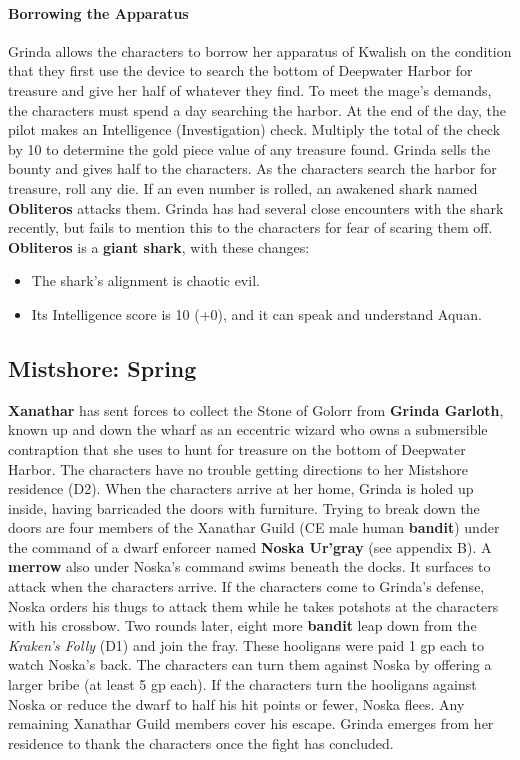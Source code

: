 \documentclass[10pt,a4paper,twoside,twocolumn,openany,nodeprecatedcode]{dndbook}
\begin{document}
\paragraph{Borrowing the Apparatus}
Grinda allows the characters to borrow her apparatus of Kwalish on the condition that they first use the device to search the bottom of Deepwater Harbor for treasure and give her half of whatever they find. To meet the mage's demands, the characters must spend a day searching the harbor. At the end of the day, the pilot makes an Intelligence (Investigation) check. Multiply the total of the check by 10 to determine the gold piece value of any treasure found. Grinda sells the bounty and gives half to the characters.
As the characters search the harbor for treasure, roll any die. If an even number is rolled, an awakened shark named \textbf{Obliteros} attacks them. Grinda has had several close encounters with the shark recently, but fails to mention this to the characters for fear of scaring them off. \textbf{Obliteros} is a \textbf{giant shark}, with these changes:
\begin{itemize}

\item The shark's alignment is chaotic evil.
\item Its Intelligence score is 10 (+0), and it can speak and understand Aquan.
\end{itemize}


\subsection{Mistshore: Spring}
\textbf{Xanathar} has sent forces to collect the Stone of Golorr from \textbf{Grinda Garloth}, known up and down the wharf as an eccentric wizard who owns a submersible contraption that she uses to hunt for treasure on the bottom of Deepwater Harbor. The characters have no trouble getting directions to her Mistshore residence (D2).
When the characters arrive at her home, Grinda is holed up inside, having barricaded the doors with furniture. Trying to break down the doors are four members of the Xanathar Guild (CE male human \textbf{bandit}) under the command of a dwarf enforcer named \textbf{Noska Ur'gray} (see appendix B). A \textbf{merrow} also under Noska's command swims beneath the docks. It surfaces to attack when the characters arrive.
If the characters come to Grinda's defense, Noska orders his thugs to attack them while he takes potshots at the characters with his crossbow. Two rounds later, eight more \textbf{bandit} leap down from the \textit{Kraken's Folly} (D1) and join the fray. These hooligans were paid 1 gp each to watch Noska's back. The characters can turn them against Noska by offering a larger bribe (at least 5 gp each).
If the characters turn the hooligans against Noska or reduce the dwarf to half his hit points or fewer, Noska flees. Any remaining Xanathar Guild members cover his escape. Grinda emerges from her residence to thank the characters once the fight has concluded.
\end{document}
